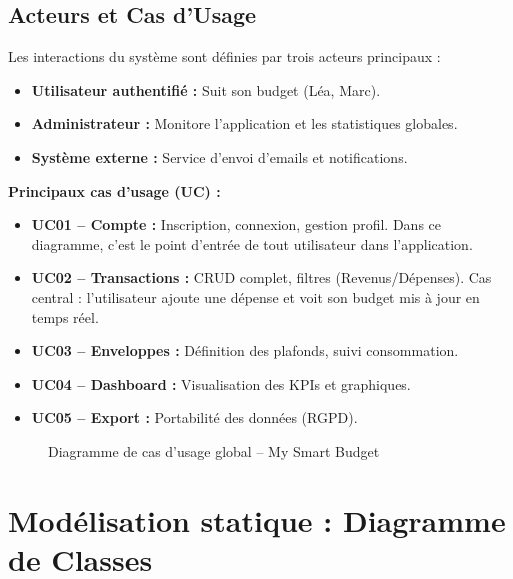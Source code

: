 \subsection{Acteurs et Cas d'Usage}

Les interactions du système sont définies par trois acteurs principaux :
\begin{itemize}
    \item \textbf{Utilisateur authentifié :} Suit son budget (Léa, Marc).
    \item \textbf{Administrateur :} Monitore l'application et les statistiques globales.
    \item \textbf{Système externe :} Service d'envoi d'emails et notifications.
\end{itemize}

\textbf{Principaux cas d'usage (UC) :}
\begin{itemize}
    \item \textbf{UC01 -- Compte :} Inscription, connexion, gestion profil. Dans ce diagramme, c'est le point d'entrée de tout utilisateur dans l'application.
    \item \textbf{UC02 -- Transactions :} CRUD complet, filtres (Revenus/Dépenses). Cas central : l'utilisateur ajoute une dépense et voit son budget mis à jour en temps réel.
    \item \textbf{UC03 -- Enveloppes :} Définition des plafonds, suivi consommation.
    \item \textbf{UC04 -- Dashboard :} Visualisation des KPIs et graphiques.
    \item \textbf{UC05 -- Export :} Portabilité des données (RGPD).
\end{itemize}

\begin{figure}[H]
    \centering
    \caption{Diagramme de cas d'usage global -- My Smart Budget}
    \label{fig:usage_global}
\end{figure}




\section{Modélisation statique : Diagramme de Classes}

